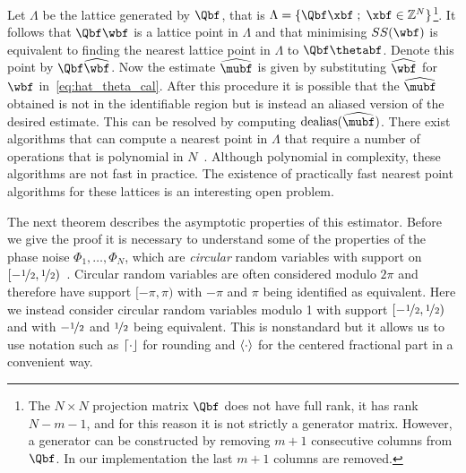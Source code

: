 \documentclass[journal]{IEEEtran}
\begin{document}
Let $\Lambda$ be the lattice generated by $\Qbf$, that is $\Lambda = \{\Qbf\xbf \mid \xbf \in \ints^N \}$\footnote{The $N \times N$ projection matrix $\Qbf$ does not have full rank, it has rank $N-m-1$, and for this reason it is not strictly a generator matrix.  However, a generator can be constructed by removing $m+1$ consecutive columns from $\Qbf$. In our implementation the last $m+1$ columns are removed.}.  It follows that $\Qbf \wbf$ is a lattice point in $\Lambda$ and that minimising $SS(\wbf)$ is equivalent to finding the nearest lattice point in $\Lambda$ to $\Qbf\thetabf$.  Denote this point by $\Qbf\widehat{\wbf}$.  Now the estimate $\widehat{\mubf}$ is given by substituting $\widehat{\wbf}$ for $\wbf$ in~\eqref{eq:hat_theta_cal}.  After this procedure it is possible that the $\widehat{\mubf}$ obtained is not in the identifiable region but is instead an aliased version of the desired estimate. This can be resolved by computing $\dealias(\widehat{\mubf})$.  There exist algorithms that can compute a nearest point in $\Lambda$ that require a number of operations that is polynomial in $N$~\cite[Sec 4.3]{McKilliam2010thesis}.  Although polynomial in complexity, these algorithms are not fast in practice.  The existence of practically fast nearest point algorithms for these lattices is an interesting open problem.

The next theorem describes the asymptotic properties of this estimator.  Before we give the proof it is necessary to understand some of the properties of the phase noise $\Phi_1,\dots,\Phi_N$, which are \emph{circular} random variables with support on $[-\nicefrac{1}{2}, \nicefrac{1}{2})$~\cite{McKilliam2010thesis,McKilliam_mean_dir_est_sq_arc_length2010,Mardia_directional_statistics,Fisher1993}.  Circular random variables are often considered modulo $2\pi$ and therefore have support $[-\pi, \pi)$ with $-\pi$ and $\pi$ being identified as equivalent.  Here we instead consider circular random variables modulo 1 with support $[-\nicefrac{1}{2}, \nicefrac{1}{2})$ and with $-\nicefrac{1}{2}$ and $\nicefrac{1}{2}$ being equivalent.  This is nonstandard but it allows us to use notation such as ${\left\lceil \cdot \right\rfloor}$ for rounding and $\left\langle \cdot \right\rangle$ for the centered fractional part in a convenient way.   %
\end{document}
